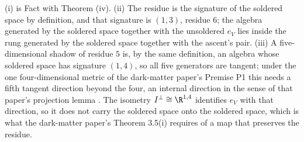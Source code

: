 (i) is Fact  with Theorem (iv). (ii) The residue is the signature of the soldered space by definition, and that signature is $(1,3)$, residue $6$; the algebra generated by the soldered space together with the unsoldered $e_{V}$ lies inside the rung generated by the soldered space together with the ascent's pair. (iii) A five-dimensional shadow of residue $5$ is, by the same definition, an algebra whose soldered space has signature $(1,4)$, so all five generators are tangent; under the one four-dimensional metric of the dark-matter paper's Premise P1 this needs a fifth tangent direction beyond the four, an internal direction in the sense of that paper's projection lemma \cite[Lem.~6.1]{ButlerT14}. The isometry $I^{\perp} \cong \R^{1,4}$ identifies $e_{V}$ with that direction, so it does not carry the soldered space onto the soldered space, which is what the dark-matter paper's Theorem 3.5(i) requires of a map that preserves the residue.
